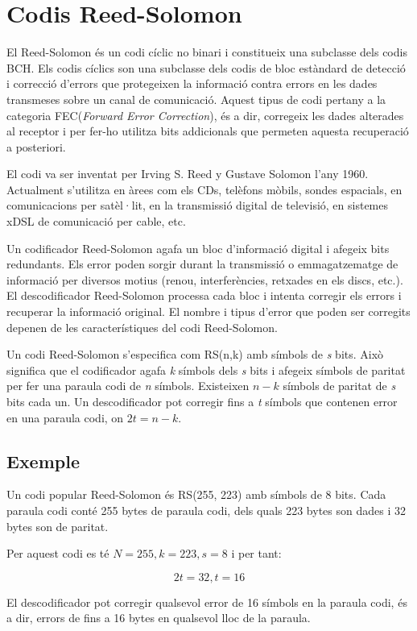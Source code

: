 \section{Codis Reed-Solomon}
El Reed-Solomon és un codi cíclic no binari i constitueix una subclasse dels
codis BCH. Els codis cíclics son una subclasse dels codis de bloc estàndard de
detecció i correcció d'errors que protegeixen la informació contra errors en les
dades transmeses sobre un canal de comunicació. Aquest tipus de codi pertany a
la categoria FEC(\emph{Forward Error Correction}), és a dir, corregeix les dades
alterades al receptor i per fer-ho utilitza bits addicionals que permeten
aquesta recuperació a posteriori. 

El codi va ser inventat per Irving S. Reed y Gustave Solomon l'any 1960.
Actualment s'utilitza en àrees com els CDs, telèfons mòbils, sondes espacials,
en comunicacions per satèl·lit, en la transmissió digital de televisió, en
sistemes xDSL de comunicació per cable, etc. 

Un codificador Reed-Solomon agafa un bloc d'informació digital i afegeix bits
redundants. Els error poden sorgir durant la transmissió o emmagatzematge de
informació per diversos motius (renou, interferències, retxades en els discs,
etc.). El descodificador Reed-Solomon processa cada bloc i intenta corregir els
errors i recuperar la informació original. El nombre i tipus d'error que poden
ser corregits depenen de les característiques del codi Reed-Solomon. 

Un codi Reed-Solomon s'especifica com RS(n,k) amb símbols de \emph{s} bits. Això
significa que el codificador agafa \emph{k} símbols dels \emph{s} bits i afegeix
símbols de paritat per fer una paraula codi de \emph{n} símbols. Existeixen
$n-k$ símbols de paritat de \emph{s} bits cada un. Un descodificador pot corregir
fins a \emph{t} símbols que contenen error en una paraula codi, on $2t=n-k$. 

\subsection{Exemple}
Un codi popular Reed-Solomon és RS(255, 223) amb símbols de 8 bits.
Cada paraula codi conté 255 bytes de paraula codi, dels quals 223 bytes
son dades i 32 bytes son de paritat. 

Per aquest codi es té $N = 255, k = 223, s = 8$ i per tant: 

$$2t = 32, t = 16$$

El descodificador pot corregir qualsevol error de 16 símbols en la paraula codi,
és a dir, errors de fins a 16 bytes en qualsevol lloc de la paraula.